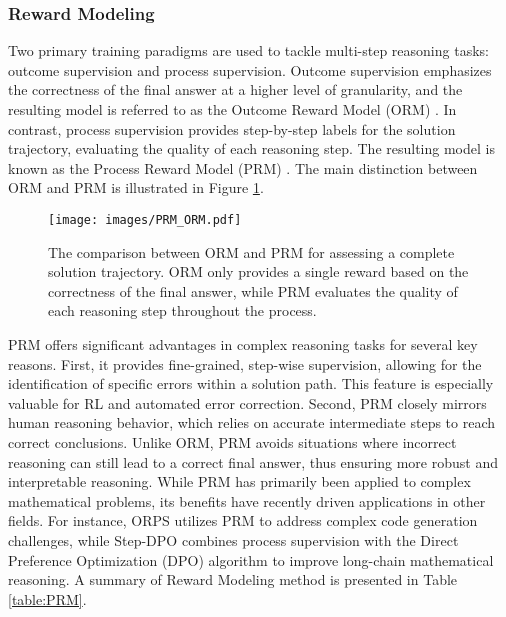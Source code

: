




\subsubsection{Reward Modeling}\label{prm}


Two primary training paradigms are used to tackle multi-step reasoning tasks: outcome supervision and process supervision. 
Outcome supervision emphasizes the correctness of the final answer at a higher level of granularity, and the resulting model is referred to as the Outcome Reward Model (ORM) \cite{cobbe2021training, yu2023outcome}. 
In contrast, process supervision provides step-by-step labels for the solution trajectory, evaluating the quality of each reasoning step. 
The resulting model is known as the Process Reward Model (PRM) \cite{uesato2022solving, lightmanlet, li2023making}. The main distinction between ORM and PRM is illustrated in Figure \ref{fig:prm_vs_orm}.


\begin{figure}[t]
    \centering
    \texttt{[image: images/PRM\_ORM.pdf]}
    \caption{The comparison between ORM and PRM for assessing a complete solution trajectory. ORM only provides a single reward based on the correctness of the final answer, while PRM evaluates the quality of each reasoning step throughout the process.}
    \label{fig:prm_vs_orm}
\end{figure}




PRM offers significant advantages \cite{wu2023fine, wang2024math} in complex reasoning tasks for several key reasons. First, it provides fine-grained, step-wise supervision, allowing for the identification of specific errors within a solution path. This feature is especially valuable for RL and automated error correction. Second, PRM closely mirrors human reasoning behavior, which relies on accurate intermediate steps to reach correct conclusions. Unlike ORM, PRM avoids situations where incorrect reasoning can still lead to a correct final answer, thus ensuring more robust and interpretable reasoning. While PRM has primarily been applied to complex mathematical problems, its benefits have recently driven applications in other fields. For instance, ORPS \cite{yu2024outcome} utilizes PRM to address complex code generation challenges, while Step-DPO \cite{lai2024step} combines process supervision with the Direct Preference Optimization (DPO) algorithm \cite{rafailov2024direct} to improve long-chain mathematical reasoning. A summary of Reward Modeling method is presented in Table \ref{table:PRM}.






